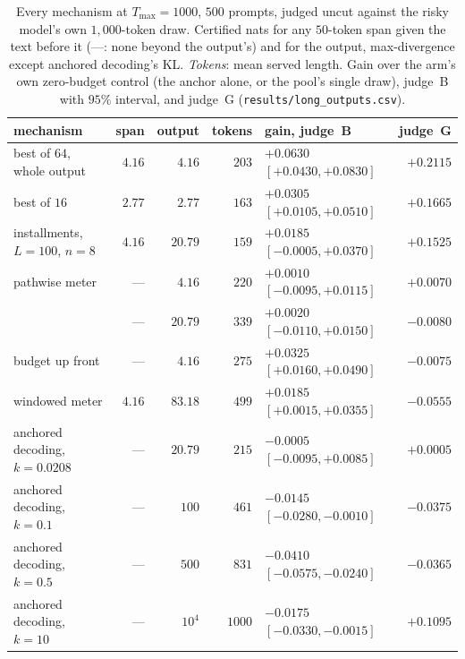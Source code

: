 \begin{table}[ht]
\centering\footnotesize
\caption{Every mechanism at $T_{\max} = 1000$, $500$ prompts, judged uncut against the risky model's own
$1{,}000$-token draw. Certified nats for any $50$-token span given the text before it (---: none beyond
the output's) and for the output, max-divergence except anchored decoding's KL. \emph{Tokens}: mean
served length. Gain over the arm's own zero-budget control (the anchor alone, or the pool's single draw),
judge~B with $95\%$ interval, and judge~G (\texttt{results/\allowbreak long\_\allowbreak outputs.csv}).}\label{tab:long}
\setlength{\tabcolsep}{3.5pt}
\begin{tabular}{@{}lrrrlr@{}}
\toprule
mechanism & span & output & tokens & gain, judge~B & judge~G \\
\midrule
best of $64$, whole output & $4.16$ & $4.16$ & $203$ & $+0.0630$ $[+0.0430, +0.0830]$ & $+0.2115$ \\
best of $16$ & $2.77$ & $2.77$ & $163$ & $+0.0305$ $[+0.0105, +0.0510]$ & $+0.1665$ \\
installments, $L=100$, $n=8$ & $4.16$ & $20.79$ & $159$ & $+0.0185$ $[-0.0005, +0.0370]$ & $+0.1525$ \\
pathwise meter & --- & $4.16$ & $220$ & $+0.0010$ $[-0.0095, +0.0115]$ & $+0.0070$ \\
 & --- & $20.79$ & $339$ & $+0.0020$ $[-0.0110, +0.0150]$ & $-0.0080$ \\
budget up front & --- & $4.16$ & $275$ & $+0.0325$ $[+0.0160, +0.0490]$ & $-0.0075$ \\
windowed meter & $4.16$ & $83.18$ & $499$ & $+0.0185$ $[+0.0015, +0.0355]$ & $-0.0555$ \\
anchored decoding, $k=0.0208$ & --- & $20.79$ & $215$ & $-0.0005$ $[-0.0095, +0.0085]$ & $+0.0005$ \\
anchored decoding, $k=0.1$ & --- & $100$ & $461$ & $-0.0145$ $[-0.0280, -0.0010]$ & $-0.0375$ \\
anchored decoding, $k=0.5$ & --- & $500$ & $831$ & $-0.0410$ $[-0.0575, -0.0240]$ & $-0.0365$ \\
anchored decoding, $k=10$ & --- & $10^4$ & $1000$ & $-0.0175$ $[-0.0330, -0.0015]$ & $+0.1095$ \\
\bottomrule
\end{tabular}
\end{table}

